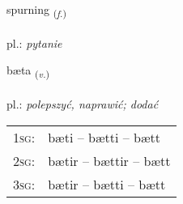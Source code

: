\documentclass[frontgrid, backgrid]{flacards}\usepackage[]{graphicx}\usepackage[]{xcolor}
\begin{document}
\renewcommand{\flhead}{\vskip5pt \fboxsep=0pt {\small\bfseries\footnotesize Nafnorð | Noun}}
\renewcommand{\fcfoot}{\vskip5pt \fboxsep=0pt \hspace{2pt}{\small\bfseries\footnotesize 1K}}

\renewcommand{\blhead}{\vskip5pt {\small\bfseries\footnotesize Nafnorð | Noun }}
\renewcommand{\bcfoot}{\vskip5pt \hspace{2pt}{\small\bfseries\footnotesize 1K}}


{spurning \small{\textsubscript{(\textit{f.})}} \\[1ex] %
\textphonetic{[spʏrtniŋk]} \\
pl.: \emph{pytanie} \\  [2ex]
\renewcommand*{\arraystretch}{0.8}
}

\renewcommand{\flhead}{\vskip5pt \fboxsep=0pt {\small\bfseries\footnotesize Sagnorð | Verb}}
\renewcommand{\fcfoot}{\vskip5pt \fboxsep=0pt \hspace{2pt}{\small\bfseries\footnotesize 1K}}

\renewcommand{\blhead}{\vskip5pt {\small\bfseries\footnotesize Sagnorð | Verb }}
\renewcommand{\bcfoot}{\vskip5pt \hspace{2pt}{\small\bfseries\footnotesize 1K}}


{bæta \small{\textsubscript{(\textit{v.})}} \\[1ex] %
\textphonetic{[paiːta]} \\
pl.: \emph{polepszyć, naprawić; dodać} \\  [2ex]
\renewcommand*{\arraystretch}{0.8}
\begin{tabular}{p{1cm}l}
\textsc{1sg}: & bæti -- bætti -- bætt \\ 
\textsc{2sg}: & bætir -- bættir -- bætt \\ 
\textsc{3sg}: & bætir -- bætti -- bætt \\ 
\end{tabular}
}
\end{document}
